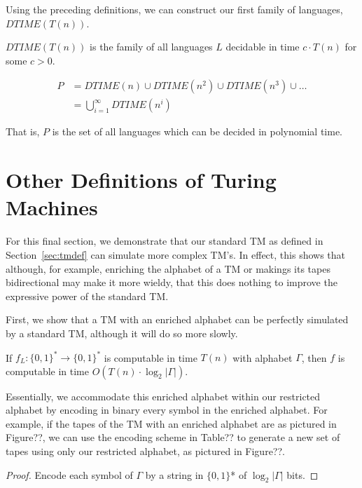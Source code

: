 \documentclass[usletter]{article}
\begin{document}
Using the preceding definitions, we can construct our first family of languages, $DTIME(T(n))$.

\begin{definition}
$DTIME(T(n))$ is the family of all languages $L$ decidable in time $c\cdot T(n)$ for some $c>0$.
\end{definition}

\begin{definition}
\begin{align}
P &= DTIME(n) \cup DTIME(n^2) \cup DTIME(n^3) \cup \dots\\
&= \bigcup\limits_{i=1}^{\infty} DTIME(n^i)
\end{align}
\end{definition}

That is, $P$ is the set of all languages which can be decided in polynomial time.

\section{Other Definitions of Turing Machines}

For this final section, we demonstrate that our standard TM as defined in Section~\ref{sec:tmdef} can simulate more complex TM's. In effect, this shows that although, for example, enriching the alphabet of a TM or makings its tapes bidirectional may make it more wieldy, that this does nothing to improve the expressive power of the standard TM.

First, we show that a TM with an enriched alphabet can be perfectly simulated by a standard TM, although it will do so more slowly.

\begin{definition}
If $f_L : \{0,1\}^* \rightarrow \{0,1\}^*$ is computable in time $T(n)$ with alphabet $\Gamma$, then $f$ is computable in time $O(T(n)\cdot \log_2|\Gamma|)$.
\end{definition}

Essentially, we accommodate this enriched alphabet within our restricted alphabet by encoding in binary every symbol in the enriched alphabet. For example, if the tapes of the TM with an enriched alphabet are as pictured in Figure??, we can use the encoding scheme in Table?? to generate a new set of tapes using only our restricted alphabet, as pictured in Figure??.

\begin{proof}
Encode each symbol of $\Gamma$ by a string in $\{0,1\}$* of $\log_2|\Gamma|$ bits.



\end{proof}
\end{document}
